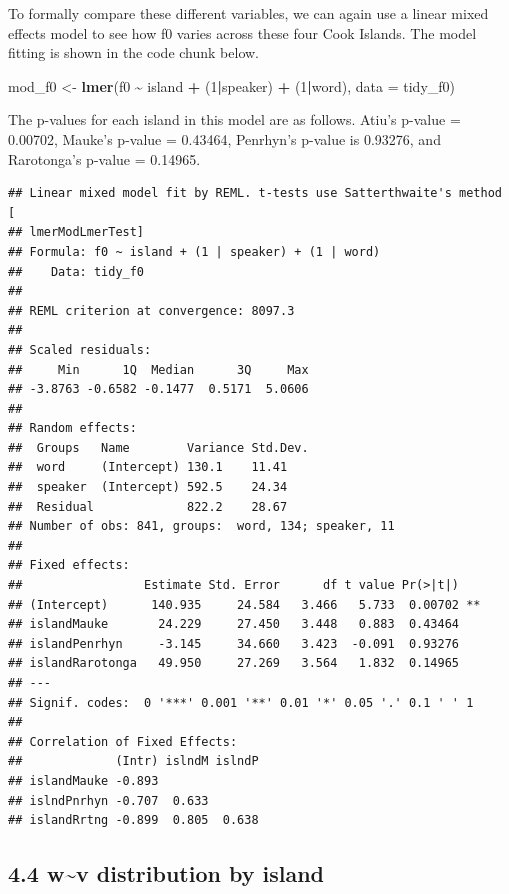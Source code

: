 \documentclass[
  ,man,floatsintext]{apa6}
\newenvironment{Shaded}{\begin{snugshade}}{\end{snugshade}}
\newcommand{\AttributeTok}[1]{\textcolor[rgb]{0.13,0.29,0.53}{#1}}
\newcommand{\DecValTok}[1]{\textcolor[rgb]{0.00,0.00,0.81}{#1}}
\newcommand{\FunctionTok}[1]{\textcolor[rgb]{0.13,0.29,0.53}{\textbf{#1}}}
\newcommand{\NormalTok}[1]{#1}
\newcommand{\OtherTok}[1]{\textcolor[rgb]{0.56,0.35,0.01}{#1}}
\newcommand{\SpecialCharTok}[1]{\textcolor[rgb]{0.81,0.36,0.00}{\textbf{#1}}}
\begin{document}
To formally compare these different variables, we can again use a linear mixed effects model to see how f0 varies across these four Cook Islands. The model fitting is shown in the code chunk below.

\begin{Shaded}
\begin{Highlighting}[]
\NormalTok{mod\_f0 }\OtherTok{\textless{}{-}} \FunctionTok{lmer}\NormalTok{(f0 }\SpecialCharTok{\textasciitilde{}}\NormalTok{ island }\SpecialCharTok{+}\NormalTok{ (}\DecValTok{1}\SpecialCharTok{|}\NormalTok{speaker) }\SpecialCharTok{+}\NormalTok{ (}\DecValTok{1}\SpecialCharTok{|}\NormalTok{word), }\AttributeTok{data =}\NormalTok{ tidy\_f0)}
\end{Highlighting}
\end{Shaded}

The p-values for each island in this model are as follows. Atiu's p-value = 0.00702, Mauke's p-value = 0.43464, Penrhyn's p-value is 0.93276, and Rarotonga's p-value = 0.14965.

\begin{verbatim}
## Linear mixed model fit by REML. t-tests use Satterthwaite's method [
## lmerModLmerTest]
## Formula: f0 ~ island + (1 | speaker) + (1 | word)
##    Data: tidy_f0
## 
## REML criterion at convergence: 8097.3
## 
## Scaled residuals: 
##     Min      1Q  Median      3Q     Max 
## -3.8763 -0.6582 -0.1477  0.5171  5.0606 
## 
## Random effects:
##  Groups   Name        Variance Std.Dev.
##  word     (Intercept) 130.1    11.41   
##  speaker  (Intercept) 592.5    24.34   
##  Residual             822.2    28.67   
## Number of obs: 841, groups:  word, 134; speaker, 11
## 
## Fixed effects:
##                 Estimate Std. Error      df t value Pr(>|t|)   
## (Intercept)      140.935     24.584   3.466   5.733  0.00702 **
## islandMauke       24.229     27.450   3.448   0.883  0.43464   
## islandPenrhyn     -3.145     34.660   3.423  -0.091  0.93276   
## islandRarotonga   49.950     27.269   3.564   1.832  0.14965   
## ---
## Signif. codes:  0 '***' 0.001 '**' 0.01 '*' 0.05 '.' 0.1 ' ' 1
## 
## Correlation of Fixed Effects:
##             (Intr) islndM islndP
## islandMauke -0.893              
## islndPnrhyn -0.707  0.633       
## islandRrtng -0.899  0.805  0.638
\end{verbatim}

\subsection{4.4 w\textasciitilde v distribution by island}\label{wv-distribution-by-island}
\end{document}
